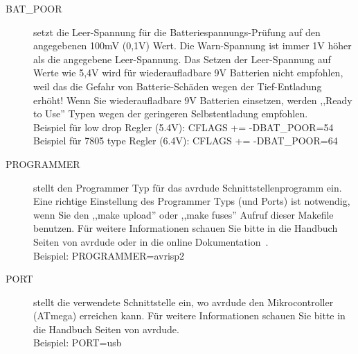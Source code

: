 \begin{description}
  \item[BAT\_POOR] setzt die Leer-Spannung f\"ur die Batteriespannungs-Pr\"ufung auf den angegebenen 100mV (0,1V) Wert.
Die Warn-Spannung ist immer 1V h\"oher als die angegebene Leer-Spannung.
Das Setzen der Leer-Spannung auf Werte wie 5,4V wird f\"ur wiederaufladbare 9V Batterien nicht empfohlen,
weil das die Gefahr von Batterie-Sch\"aden wegen der Tief-Entladung erh\"oht!
Wenn Sie wiederaufladbare 9V Batterien einsetzen, werden ,,Ready to Use'' Typen wegen der geringeren Selbstentladung empfohlen.\\
Beispiel f\"ur low drop Regler (5.4V): CFLAGS += -DBAT\_POOR=54 \\
Beispiel f\"ur 7805 type Regler (6.4V): CFLAGS += -DBAT\_POOR=64
  \item[PROGRAMMER] stellt den Programmer Typ f\"ur das avrdude Schnittstellenprogramm ein.
Eine richtige Einstellung des Programmer Typs (und Ports) ist notwendig, wenn Sie den ,,make upload'' oder
,,make fuses'' Aufruf dieser Makefile benutzen.
F\"ur weitere Informationen schauen Sie bitte in die Handbuch Seiten von avrdude oder in die online Dokumentation~\cite{avrdude}.\\
Beispiel: PROGRAMMER=avrisp2
  \item[PORT] stellt die verwendete Schnittstelle ein, wo avrdude den Mikrocontroller (ATmega) erreichen kann.
F\"ur weitere Informationen schauen Sie bitte in die Handbuch Seiten von avrdude.\\
Beispiel: PORT=usb

\end{description}

